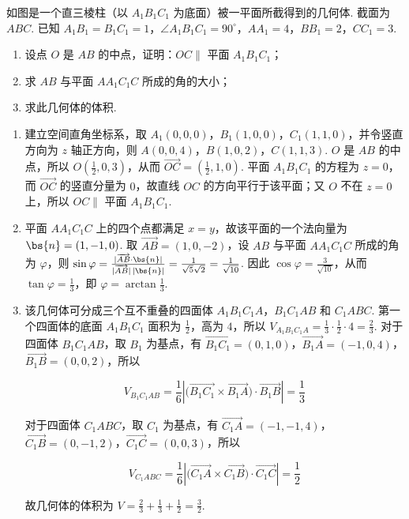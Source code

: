 \begin{problem}
如图是一个直三棱柱（以 \(A_{1}B_{1}C_{1}\) 为底面）被一平面所截得到的几何体. 截面为 \(ABC\). 已知 \(A_{1}B_{1} = B_{1}C_{1} = 1\)，\(\angle A_{1}B_{1}C_{1} = 90^{\circ}\)，\(AA_{1} = 4\)，\(BB_{1} = 2\)，\(CC_{1} = 3\).

\begin{enumerate}
\item 设点 \(O\) 是 \(AB\) 的中点，证明：\(OC \parallel\) 平面 \(A_{1}B_{1}C_{1}\)；
\item 求 \(AB\) 与平面 \(AA_{1}C_{1}C\) 所成的角的大小；
\item 求此几何体的体积.
\end{enumerate}


\begin{solution}
\begin{enumerate}
\item 建立空间直角坐标系，取 \(A_1(0,0,0)\)，\(B_1(1,0,0)\)，\(C_1(1,1,0)\)，并令竖直方向为 \(z\) 轴正方向，则 \(A(0,0,4)\)，\(B(1,0,2)\)，\(C(1,1,3)\). \(O\) 是 \(AB\) 的中点，所以 \(O\left(\frac{1}{2},0,3\right)\)，从而 \(\overrightarrow{OC}=\left(\frac{1}{2},1,0\right)\). 平面 \(A_1B_1C_1\) 的方程为 \(z=0\)，而 \(\overrightarrow{OC}\) 的竖直分量为 \(0\)，故直线 \(OC\) 的方向平行于该平面；又 \(O\) 不在 \(z=0\) 上，所以 \(OC\parallel\) 平面 \(A_1B_1C_1\).

\item 平面 \(AA_1C_1C\) 上的四个点都满足 \(x=y\)，故该平面的一个法向量为 \(\bs{n}=(1,-1,0)\). 取 \(\overrightarrow{AB}=(1,0,-2)\)，设 \(AB\) 与平面 \(AA_1C_1C\) 所成的角为 \(\varphi\)，则 \(\sin\varphi=\frac{|\overrightarrow{AB}\cdot\bs{n}|}{|\overrightarrow{AB}|\,|\bs{n}|}=\frac{1}{\sqrt{5}\sqrt{2}}=\frac{1}{\sqrt{10}}\). 因此 \(\cos\varphi=\frac{3}{\sqrt{10}}\)，从而 \(\tan\varphi=\frac{1}{3}\)，即 \(\varphi=\arctan\frac{1}{3}\).

\item 该几何体可分成三个互不重叠的四面体 \(A_1B_1C_1A\)，\(B_1C_1AB\) 和 \(C_1ABC\). 第一个四面体的底面 \(A_1B_1C_1\) 面积为 \(\frac{1}{2}\)，高为 \(4\)，所以 \(V_{A_1B_1C_1A}=\frac{1}{3}\cdot\frac{1}{2}\cdot4=\frac{2}{3}\). 对于四面体 \(B_1C_1AB\)，取 \(B_1\) 为基点，有 \(\overrightarrow{B_1C_1}=(0,1,0)\)，\(\overrightarrow{B_1A}=(-1,0,4)\)，\(\overrightarrow{B_1B}=(0,0,2)\)，所以

\[
V_{B_1C_1AB}=\frac{1}{6}\left|\bigl(\overrightarrow{B_1C_1}\times\overrightarrow{B_1A}\bigr)\cdot\overrightarrow{B_1B}\right|=\frac{1}{3}
\]

对于四面体 \(C_1ABC\)，取 \(C_1\) 为基点，有 \(\overrightarrow{C_1A}=(-1,-1,4)\)，\(\overrightarrow{C_1B}=(0,-1,2)\)，\(\overrightarrow{C_1C}=(0,0,3)\)，所以

\[
V_{C_1ABC}=\frac{1}{6}\left|\bigl(\overrightarrow{C_1A}\times\overrightarrow{C_1B}\bigr)\cdot\overrightarrow{C_1C}\right|=\frac{1}{2}
\]

故几何体的体积为 \(V=\frac{2}{3}+\frac{1}{3}+\frac{1}{2}=\frac{3}{2}\).
\end{enumerate}
\end{solution}
\end{problem}

